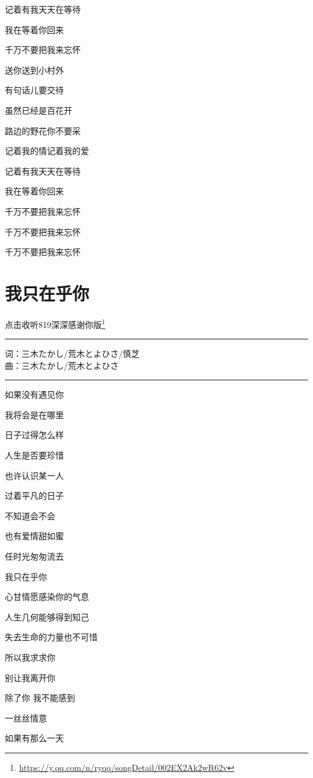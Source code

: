 \documentclass[]{ctexbook}
\renewcommand{\href}[2]{#2\footnote{\url{#1}}}
\begin{document}
记着有我天天在等待

我在等着你回来

千万不要把我来忘怀

送你送到小村外

有句话儿要交待

虽然已经是百花开

路边的野花你不要采

记着我的情记着我的爱

记着有我天天在等待

我在等着你回来

千万不要把我来忘怀

千万不要把我来忘怀

千万不要把我来忘怀

\section*{我只在乎你}\label{only-you}


\href{https://y.qq.com/n/ryqq/songDetail/002EX2Ak2wR62v}{点击收听819深深感谢你版}

\begin{center}\rule{0.5\linewidth}{0.5pt}\end{center}

词：三木たかし/荒木とよひさ/慎芝\\
曲：三木たかし/荒木とよひさ

\begin{center}\rule{0.5\linewidth}{0.5pt}\end{center}

如果没有遇见你

我将会是在哪里

日子过得怎么样

人生是否要珍惜

也许认识某一人

过着平凡的日子

不知道会不会

也有爱情甜如蜜

任时光匆匆流去

我只在乎你

心甘情愿感染你的气息

人生几何能够得到知己

失去生命的力量也不可惜

所以我求求你

别让我离开你

除了你 我不能感到

一丝丝情意

如果有那么一天
\end{document}
